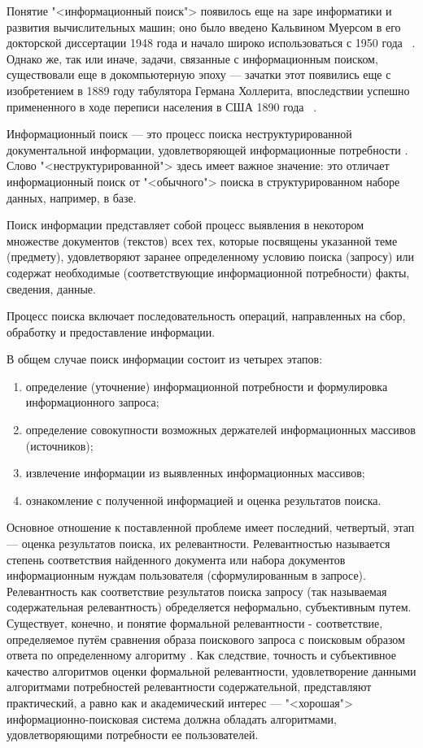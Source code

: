 Понятие "<информационный поиск"> появилось еще на заре информатики и развития вычислительных машин; оно было
введено Кальвином Муерсом в его докторской диссертации 1948 года и начало широко использоваться с 1950 года
~\cite{mooers1950theory, mooers1950information}. Однако же, так или иначе, задачи, связанные с информационным
поиском, существовали еще в докомпьютерную эпоху --- зачатки этот появились еще с изобретением в 1889 году
табулятора Германа Холлерита, впоследствии успешно примененного в ходе переписи населения в США 1890 года
~\cite{hollerith2011}.

Информационный поиск --- это процесс поиска неструктурированной документальной информации, удовлетворяющей
информационные потребности \cite{manning2011wwedenie}. Слово "<неструктурированной"> здесь имеет важное значение:
это отличает информационный поиск от "<обычного"> поиска в структурированном наборе данных, например, в базе.

Поиск информации представляет собой процесс выявления в некотором множестве документов (текстов) всех тех,
которые посвящены указанной теме (предмету), удовлетворяют заранее определенному условию поиска (запросу)
или содержат необходимые (соответствующие информационной потребности) факты, сведения, данные.

Процесс поиска включает последовательность операций, направленных на сбор, обработку и предоставление информации.

В общем случае поиск информации состоит из четырех этапов:
\begin{enumerate}[1)]
    \item определение (уточнение) информационной потребности и формулировка информационного запроса;
    \item определение совокупности возможных держателей информационных массивов (источников);
    \item извлечение информации из выявленных информационных массивов;
    \item ознакомление с полученной информацией и оценка результатов поиска.
\end{enumerate}

Основное отношение к поставленной проблеме имеет последний, четвертый, этап --- оценка результатов поиска,
их релевантности. Релевантностью называется степень соответствия найденного документа или набора документов
информационным нуждам пользователя (сформулированным в запросе). Релевантность как соответствие результатов
поиска запросу (так называемая содержательная релевантность) обределяется неформально, субъективным путем.
Существует, конечно, и понятие формальной релевантности - соответствие, определяемое путём сравнения образа
поискового запроса с поисковым образом ответа по определенному алгоритму \cite{mihalevich1989slowarj}.
Как следствие, точность и субъективное качество алгоритмов оценки формальной релевантности, удовлетворение
данными алгоритмами потребностей релевантности содержательной, представляют практический, а равно
как и академический интерес --- "<хорошая"> информационно-поисковая система должна обладать алгоритмами,
удовлетворяющими потребности ее пользователей.

